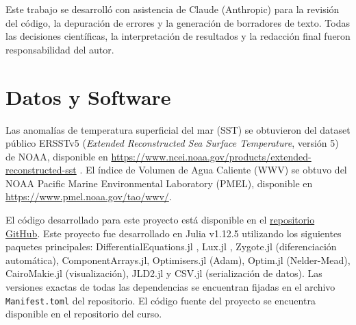 \documentclass[11pt,a4paper]{article}
\begin{document}
Este trabajo se desarrolló con asistencia de Claude (Anthropic) para la revisión del código, la depuración de errores y la generación de borradores de texto. Todas las decisiones científicas, la interpretación de resultados y la redacción final fueron responsabilidad del autor.

\section*{Datos y Software}

Las anomalías de temperatura superficial del mar (SST) se obtuvieron del dataset público ERSSTv5 (\textit{Extended Reconstructed Sea Surface Temperature}, versión 5) de NOAA, disponible en \url{https://www.ncei.noaa.gov/products/extended-reconstructed-sst} \citep{huang2017}. El índice de Volumen de Agua Caliente (WWV) se obtuvo del NOAA Pacific Marine Environmental Laboratory (PMEL), disponible en \url{https://www.pmel.noaa.gov/tao/wwv/}.

El código desarrollado para este proyecto está disponible en el \href{https://github.com/mathyrolando/BUSDE-ENSO}{repositorio GitHub}. Este proyecto fue desarrollado en Julia v1.12.5 utilizando los siguientes paquetes principales: DifferentialEquations.jl \citep{rackauckas2017}, Lux.jl \citep{lux2022}, Zygote.jl (diferenciación automática), ComponentArrays.jl, Optimisers.jl (Adam), Optim.jl (Nelder-Mead), CairoMakie.jl (visualización), JLD2.jl y CSV.jl (serialización de datos). Las versiones exactas de todas las dependencias se encuentran fijadas en el archivo \texttt{Manifest.toml} del repositorio. El código fuente del proyecto se encuentra disponible en el repositorio del curso.



\end{document}
